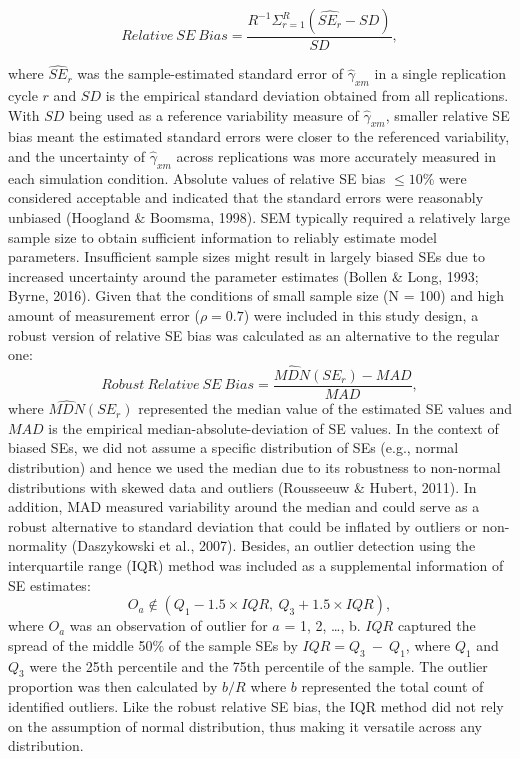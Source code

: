 \documentclass[
  man]{apa7}
\begin{document}
\begin{equation}
Relative\ SE\ Bias = \frac{R^{-1}\Sigma^{R}_{r = 1}(\widehat{SE_{r}} - SD)}{SD},
\end{equation}

where \(\widehat{SE}_{r}\) was the sample-estimated standard error of \(\hat{\gamma}_{xm}\) in a single replication cycle \(r\) and \(SD\) is the empirical standard deviation obtained from all replications. With \(SD\) being used as a reference variability measure of \(\hat{\gamma}_{xm}\), smaller relative SE bias meant the estimated standard errors were closer to the referenced variability, and the uncertainty of \(\hat{\gamma}_{xm}\) across replications was more accurately measured in each simulation condition. Absolute values of relative SE bias \(\le 10\%\) were considered acceptable and indicated that the standard errors were reasonably unbiased (Hoogland \(\&\) Boomsma, 1998).
SEM typically required a relatively large sample size to obtain sufficient information to reliably estimate model parameters. Insufficient sample sizes might result in largely biased SEs due to increased uncertainty around the parameter estimates (Bollen \& Long, 1993; Byrne, 2016). Given that the conditions of small sample size (N = 100) and high amount of measurement error (\(\rho = 0.7\)) were included in this study design, a robust version of relative SE bias was calculated as an alternative to the regular one:
\begin{equation}
Robust\ Relative\ SE\ Bias = \frac{\widehat{MDN}(SE_{r}) - MAD}{MAD},
\end{equation}
where \(\widehat{MDN}(SE_{r})\) represented the median value of the estimated SE values and \(MAD\) is the empirical median-absolute-deviation of SE values. In the context of biased SEs, we did not assume a specific distribution of SEs (e.g., normal distribution) and hence we used the median due to its robustness to non-normal distributions with skewed data and outliers (Rousseeuw \& Hubert, 2011). In addition, MAD measured variability around the median and could serve as a robust alternative to standard deviation that could be inflated by outliers or non-normality (Daszykowski et al., 2007).
Besides, an outlier detection using the interquartile range (IQR) method was included as a supplemental information of SE estimates:
\begin{equation}
O_{a} \not\in (Q_{1} - 1.5 \times IQR, \ Q_{3} + 1.5 \times IQR),
\end{equation}
where \(O_{a}\) was an observation of outlier for \(a\) = 1, 2, \ldots, b. \(IQR\) captured the spread of the middle 50\(\%\) of the sample SEs by \(IQR = Q_{3} \ - \ Q_{1}\), where \(Q_{1}\) and \(Q_{3}\) were the 25th percentile and the 75th percentile of the sample. The outlier proportion was then calculated by \(b/R\) where \(b\) represented the total count of identified outliers. Like the robust relative SE bias, the IQR method did not rely on the assumption of normal distribution, thus making it versatile across any distribution.
\end{document}
